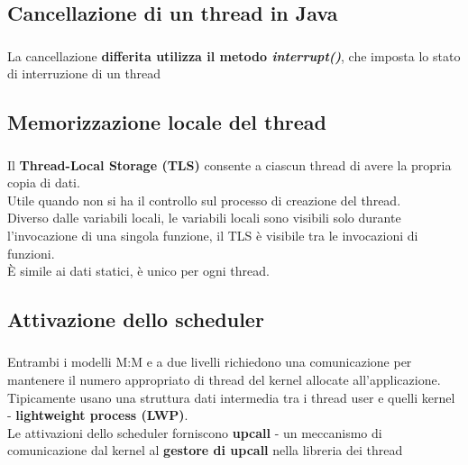 \documentclass{beamer}
\newenvironment{mainframe}{
	\begin{frame}
		\frametitle{\insertsubsection}
		\framesubtitle{\insertsection}
	}{
	\end{frame}
}
\begin{document}
\subsection{Cancellazione di un thread in Java}
\begin{mainframe}
	La cancellazione \textbf{differita utilizza il metodo \textit{interrupt()}}, che imposta lo stato di interruzione di un thread
\end{mainframe}
\subsection{Memorizzazione locale del thread}
\begin{mainframe}
	Il \textbf{Thread-Local Storage (TLS)} consente a ciascun thread di avere la propria copia di dati.\\
	Utile quando non si ha il controllo sul processo di creazione del thread.\\
	Diverso dalle variabili locali, le variabili locali sono visibili solo durante l'invocazione di una singola funzione, il TLS è visibile tra le invocazioni di funzioni.\\
	È simile ai dati statici, è unico per ogni thread.
\end{mainframe}
\subsection{Attivazione dello scheduler}
\begin{mainframe}
	Entrambi i modelli M:M e a due livelli richiedono una comunicazione per mantenere il numero appropriato di thread del kernel allocate all'applicazione.\\
	Tipicamente usano una struttura dati intermedia tra i thread user e quelli kernel - \textbf{lightweight process (LWP)}.\\
	Le attivazioni dello scheduler forniscono \textbf{upcall} - un meccanismo di comunicazione dal kernel al \textbf{gestore di upcall} nella libreria dei thread
\end{mainframe}
\end{document}
